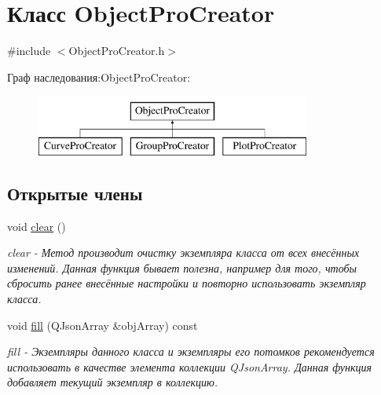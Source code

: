 \hypertarget{classObjectProCreator}{\section{Класс \-Object\-Pro\-Creator}
\label{classObjectProCreator}
}


{\ttfamily \#include $<$\-Object\-Pro\-Creator.\-h$>$}

Граф наследования\-:\-Object\-Pro\-Creator\-:\begin{figure}[H]
\begin{center}
\leavevmode
\includegraphics[height=2.000000cm]{classObjectProCreator}
\end{center}
\end{figure}
\subsection*{Открытые члены}
\begin{DoxyCompactItemize}
\item 
\hypertarget{classObjectProCreator_af975e9ddbd57c577bcab63b062a2da2b}{void \hyperlink{classObjectProCreator_af975e9ddbd57c577bcab63b062a2da2b}{clear} ()}\label{classObjectProCreator_af975e9ddbd57c577bcab63b062a2da2b}

\begin{DoxyCompactList}\small\item\em clear -\/ Метод производит очистку экземпляра класса от всех внесённых изменений. Данная функция бывает полезна, например для того, чтобы сбросить ранее внесённые настройки и повторно использовать экземпляр класса. \end{DoxyCompactList}\item 
void \hyperlink{classObjectProCreator_ad207409ada5bbdef1dd4cf5e0d7d6f1d}{fill} (\-Q\-Json\-Array \&obj\-Array) const 
\begin{DoxyCompactList}\small\item\em fill -\/ Экземпляры данного класса и экземпляры его потомков рекомендуется использовать в качестве элемента коллекции \-Q\-Json\-Array. Данная функция добавляет текущий экземпляр в коллекцию. \end{DoxyCompactList}\end{DoxyCompactItemize}
